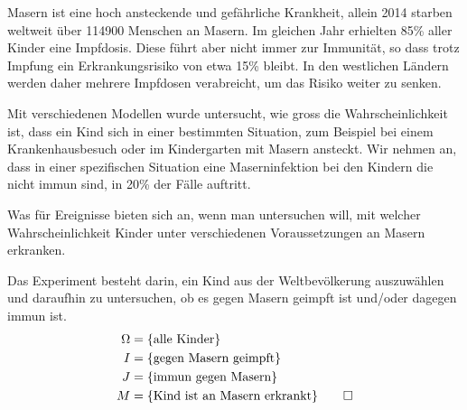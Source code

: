 Masern ist eine hoch ansteckende und gefährliche Krankheit,
allein 2014 starben weltweit über 114900 Menschen an Masern.
Im gleichen Jahr erhielten 85\% aller Kinder eine Impfdosis.
Diese führt aber nicht immer zur Immunität, so dass trotz Impfung
ein Erkrankungsrisiko von etwa 15\% bleibt.
In den westlichen Ländern werden daher mehrere Impfdosen verabreicht,
um das Risiko weiter zu senken.

Mit verschiedenen Modellen wurde untersucht, wie gross die Wahrscheinlichkeit
ist, dass ein Kind sich in einer bestimmten Situation, zum Beispiel
bei einem Krankenhausbesuch oder im Kindergarten mit Masern ansteckt.
Wir nehmen an, dass in einer spezifischen Situation eine Maserninfektion
bei den Kindern die nicht immun sind, in 20\% der Fälle auftritt.

Was für Ereignisse bieten sich an, wenn man untersuchen will, mit welcher
Wahrscheinlichkeit Kinder unter verschiedenen Voraussetzungen
an Masern erkranken.


\begin{loesung}
Das Experiment besteht darin, ein Kind aus der Weltbevölkerung auszuwählen
und daraufhin zu untersuchen, ob es gegen Masern geimpft ist und/oder
dagegen immun ist.
\begin{align*}
\Omega &= \{\text{alle Kinder}\}
\\
I&=\{\text{gegen Masern geimpft}\}
\\
J&=\{\text{immun gegen Masern}\}
\\
M&=\{\text{Kind ist an Masern erkrankt}\}
\qedhere
\end{align*}
\end{loesung}
